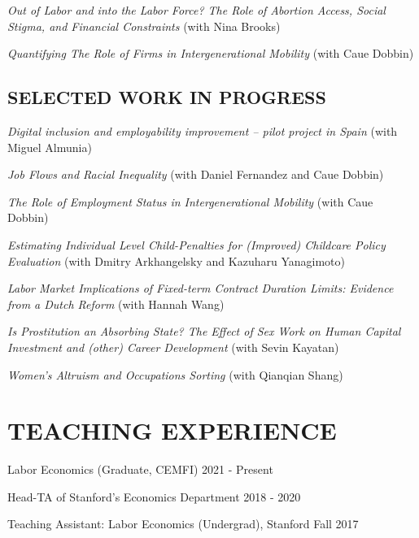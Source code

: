 \documentclass[margin]{res} %
\newcommand{\rootFolder}{/Users/tomzohar/Dropbox/}
\begin{document}
\begin{resume}
\textit{Out of Labor and into the Labor Force? The Role of Abortion Access, Social Stigma, and Financial Constraints} (with Nina Brooks) 

%

\textit{Quantifying The Role of Firms in Intergenerational Mobility} (with Caue Dobbin) 

\subsection{SELECTED WORK IN PROGRESS}

\textit{Digital inclusion and employability improvement -- pilot project in Spain} (with Miguel Almunia) 

\textit{Job Flows and Racial Inequality} (with Daniel Fernandez and Caue Dobbin) 

\textit{The Role of Employment Status in Intergenerational Mobility} (with Caue Dobbin) 

\textit{Estimating Individual Level Child-Penalties for (Improved) Childcare Policy Evaluation} (with Dmitry Arkhangelsky and Kazuharu Yanagimoto)

\textit{Labor Market Implications of Fixed-term Contract Duration Limits: Evidence from a Dutch Reform} (with Hannah Wang)

\textit{Is Prostitution an Absorbing State? The Effect of Sex Work on Human Capital Investment and (other) Career Development} (with Sevin Kayatan)

\textit{Women's Altruism and Occupations Sorting} (with Qianqian Shang)


\section{TEACHING EXPERIENCE}

Labor Economics (Graduate, CEMFI) \hfill 2021 - Present

Head-TA of Stanford's Economics Department \hfill 2018 - 2020

Teaching Assistant: Labor Economics (Undergrad), Stanford \hfill Fall 2017


\end{resume}
\end{document}
